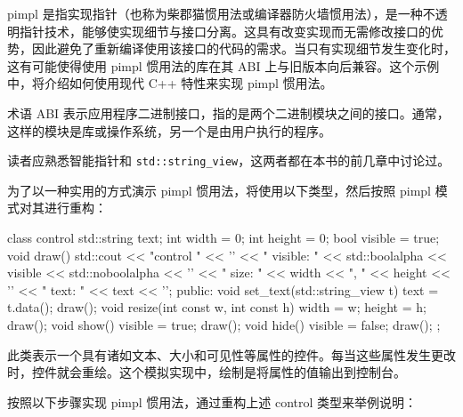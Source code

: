 
pimpl 是指实现指针（也称为柴郡猫惯用法或编译器防火墙惯用法），是一种不透明指针技术，能够使实现细节与接口分离。这具有改变实现而无需修改接口的优势，因此避免了重新编译使用该接口的代码的需求。当只有实现细节发生变化时，这有可能使得使用 pimpl 惯用法的库在其 ABI 上与旧版本向后兼容。这个示例中，将介绍如何使用现代 C++ 特性来实现 pimpl 惯用法。

\begin{myNotic}
术语 ABI 表示应用程序二进制接口，指的是两个二进制模块之间的接口。通常，这样的模块是库或操作系统，另一个是由用户执行的程序。
\end{myNotic}


读者应熟悉智能指针和 \verb|std::string_view|，这两者都在本书的前几章中讨论过。

为了以一种实用的方式演示 pimpl 惯用法，将使用以下类型，然后按照 pimpl 模式对其进行重构：

\begin{cpp}
class control
{
    std::string text;
    int width = 0;
    int height = 0;
    bool visible = true;
    void draw()
    {
        std::cout
        << "control " << '\n'
        << " visible: " << std::boolalpha << visible <<
            std::noboolalpha << '\n'
        << " size: " << width << ", " << height << '\n'
        << " text: " << text << '\n';
    }
    public:
    void set_text(std::string_view t)
    {
        text = t.data();
        draw();
    }
    void resize(int const w, int const h)
    {
        width = w;
        height = h;
        draw();
    }
    void show()
    {
        visible = true;
        draw();
    }
    void hide()
    {
        visible = false;
        draw();
    }
};
\end{cpp}

此类表示一个具有诸如文本、大小和可见性等属性的控件。每当这些属性发生更改时，控件就会重绘。这个模拟实现中，绘制是将属性的值输出到控制台。


按照以下步骤实现 pimpl 惯用法，通过重构上述 control 类型来举例说明：

